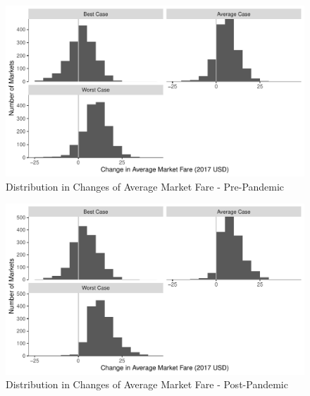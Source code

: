 \documentclass{article}
\begin{document}
\begin{appendices}
    \begin{figure}
        \caption{Distribution in Changes of Average Market Fare - Pre-Pandemic}
        \label{fig:AverageFare_ChangeDist_PrePandemic}
        \begin{center}
        \includegraphics[width = \linewidth]{PrePandemic_Merger_Change_AverageFare_Dist.pdf}
        \end{center}
    \end{figure}

    \begin{figure}
        \caption{Distribution in Changes of Average Market Fare - Post-Pandemic}
        \label{fig:AverageFare_ChangeDist_PostPandemic}
        \begin{center}
        \includegraphics[width = \linewidth]{Merger_Change_AverageFare_Dist.pdf}
        \end{center}
    \end{figure}
    

\end{appendices}
\end{document}
